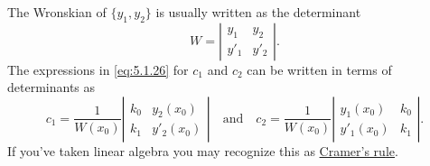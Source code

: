 \documentclass{ximera}
\begin{document}
The Wronskian of  $\{y_1,y_2\}$ is usually written as the determinant
$$
W=\left| \begin{array}{cc}
y_1 & y_2 \\
y'_1 & y'_2
\end{array} \right|.
$$
 The expressions in \eqref{eq:5.1.26} for $c_1$ and $c_2$ can
be written in terms of determinants as
$$
c_1=\frac{1}{W(x_0)}
\left| \begin{array}{cc}
k_0 & y_2(x_0) \\
k_1 & y'_2(x_0)
\end{array} \right|
\quad\mbox{and}\quad
c_2=\frac{1}{W(x_0)}
\left| \begin{array}{cc}
y_1(x_0) & k_0 \\
y'_1(x_0) &k_1
\end{array} \right|.
$$
If you've taken linear algebra you may recognize this as
\href{http://www-history.mcs.st-and.ac.uk/Mathematicians/Cramer.html}{Cramer's rule}.
 
\end{document}
